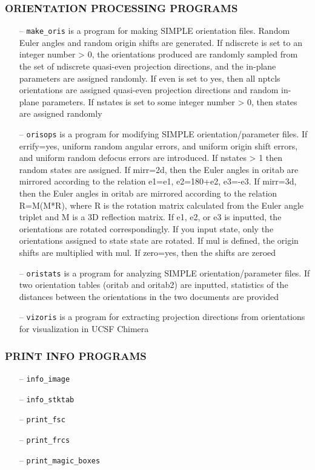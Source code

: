 \documentclass[a4paper,11pt]{article}
\newcommand{\prgname}[1]{\textcolor{NavyBlue}{\texttt{#1}}}
\begin{document}
\subsubsection{ORIENTATION PROCESSING PROGRAMS}
\begin{itemize}
\item[--] \prgname{make\_oris} is a program for making SIMPLE orientation files. Random Euler angles and random origin shifts are generated. If ndiscrete is set to an integer number > 0, the orientations produced are randomly sampled from the set of ndiscrete quasi-even projection directions, and the in-plane parameters are assigned randomly. If even is set to yes, then all nptcls orientations are assigned quasi-even projection directions and  random in-plane parameters. If nstates is set to some integer number > 0, then states are assigned randomly
\item[--] \prgname{orisops} is a program for modifying SIMPLE orientation/parameter files. If errify=yes, uniform random angular errors, and uniform origin shift errors,  and uniform random defocus errors are introduced. If nstates > 1 then random states are assigned. If mirr=2d, then the Euler angles in oritab are mirrored according to the relation e1=e1, e2=180+e2, e3=-e3. If mirr=3d, then the Euler angles in oritab are mirrored according to the relation R=M(M*R), where R is the rotation matrix calculated from the Euler angle triplet and M is a 3D reflection matrix. If e1, e2, or e3 is inputted, the orientations are rotated correspondingly. If you input state, only the orientations assigned to state state are rotated. If mul is defined, the origin shifts are multiplied with mul. If zero=yes, then the shifts are zeroed
\item[--] \prgname{oristats} is a program for analyzing SIMPLE orientation/parameter files. If two orientation tables (oritab and oritab2) are inputted, statistics of the distances between the orientations in the two documents are provided
\item[--] \prgname{vizoris} is a program for extracting projection directions from orientations for visualization in UCSF Chimera
\end{itemize}

\subsubsection{PRINT INFO PROGRAMS}
\begin{itemize}
\item[--] \prgname{info\_image}
\item[--] \prgname{info\_stktab}
\item[--] \prgname{print\_fsc}
\item[--] \prgname{print\_frcs}
\item[--] \prgname{print\_magic\_boxes}
\end{itemize}
\end{document}

